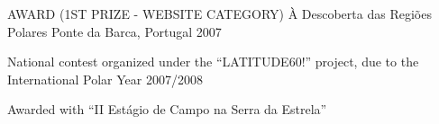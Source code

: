

\begin{cventries}
	
	\cventry
	{AWARD ({\normalsize 1}ST PRIZE - WEBSITE CATEGORY) }
	{À Descoberta das Regiões Polares}
	{Ponte da Barca, Portugal}
	{2007}
	{
		\begin{cvitems} %
			\item {National contest organized under the ``LATITUDE60!'' project, due to the International Polar Year 2007/2008}
			\item {Awarded with ``II Estágio de Campo na Serra da Estrela''}
		\end{cvitems}	
	}
	
\end{cventries}
